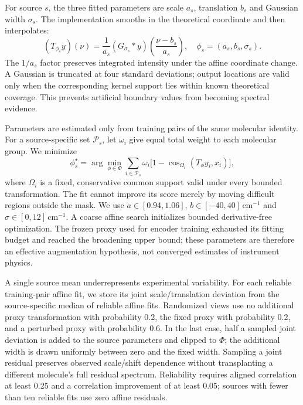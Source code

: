 For source $s$, the three fitted parameters are scale $a_s$, translation $b_s$ and Gaussian width $\sigma_s$. The implementation smooths in the theoretical coordinate and then interpolates:
\begin{equation}\label{eq:proxy}
(T_{\phi_s}y)(\nu)=\frac{1}{a_s}
 (G_{\sigma_s}*y)\!\left(\frac{\nu-b_s}{a_s}\right),
\quad \phi_s=(a_s,b_s,\sigma_s).
\end{equation}
The $1/a_s$ factor preserves integrated intensity under the affine coordinate change. A Gaussian is truncated at four standard deviations; output locations are valid only when the corresponding kernel support lies within known theoretical coverage. This prevents artificial boundary values from becoming spectral evidence.

Parameters are estimated only from training pairs of the same molecular identity. For a source-specific set $\mathcal{P}_s$, let $\omega_i$ give equal total weight to each molecular group. We minimize
\begin{equation}\label{eq:proxyfit}
\phi_s^\star=\arg\min_{\phi\in\Phi}
\sum_{i\in\mathcal{P}_s}\omega_i
\bigl[1-\operatorname{cos}_{\Omega_i}(T_\phi y_i,x_i)\bigr],
\end{equation}
where $\Omega_i$ is a fixed, conservative common support valid under every bounded transformation. The fit cannot improve its score merely by moving difficult regions outside the mask. We use $a\in[0.94,1.06]$, $b\in[-40,40]$\,cm$^{-1}$ and $\sigma\in[0,12]$\,cm$^{-1}$. A coarse affine search initializes bounded derivative-free optimization. The frozen proxy used for encoder training exhausted its fitting budget and reached the broadening upper bound; these parameters are therefore an effective augmentation hypothesis, not converged estimates of instrument physics.

A single source mean underrepresents experimental variability. For each reliable training-pair affine fit, we store its joint scale/translation deviation from the source-specific median of reliable affine fits. Randomized views use no additional proxy transformation with probability 0.2, the fixed proxy with probability 0.2, and a perturbed proxy with probability 0.6. In the last case, half a sampled joint deviation is added to the source parameters and clipped to $\Phi$; the additional width is drawn uniformly between zero and the fixed width. Sampling a joint residual preserves observed scale/shift dependence without transplanting a different molecule's full residual spectrum. Reliability requires aligned correlation at least 0.25 and a correlation improvement of at least 0.05; sources with fewer than ten reliable fits use zero affine residuals.


